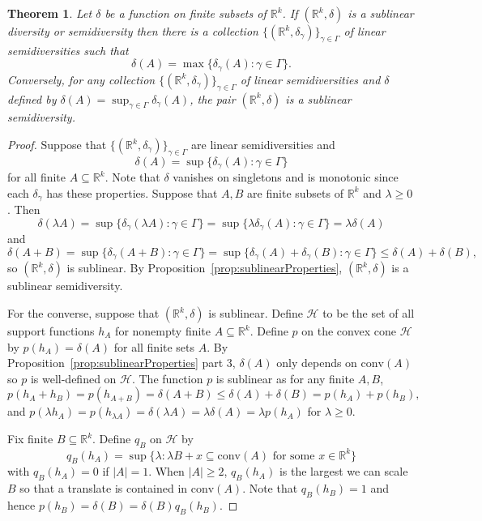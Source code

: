 \documentclass[11pt]{article}
\newtheorem{theorem}{Theorem}
\newcommand{\sH}{\mathcal{H}}
\newcommand{\conv}{\mathrm{conv}}
\renewcommand{\Re}{\mathbb{R}}
\begin{document}
\begin{theorem} \label{thm:sublinearSup}
    Let $\delta$ be a function on finite subsets of $\Re^k$. 
    If $(\Re^k,\delta)$ is a sublinear diversity or semidiversity then there is a collection $\{(\Re^k,\delta_\gamma)\}_{\gamma \in \Gamma}$ of linear semidiversities such that 
    \[\delta(A) = \max\{\delta_\gamma(A):\gamma \in \Gamma\}.\]
Conversely, for any collection $\{(\Re^k,\delta_\gamma)\}_{\gamma \in \Gamma}$ of linear semidiversities and $\delta$ defined by $\delta(A) = \sup_{\gamma \in \Gamma} \delta_\gamma(A)$, the pair $(\Re^k, \delta)$ is a sublinear semidiversity.
\end{theorem}
\begin{proof}
Suppose that $\{(\Re^k,\delta_\gamma)\}_{\gamma \in \Gamma}$ are linear semidiversities and 
 \[\delta(A) = \sup\{\delta_\gamma(A):\gamma \in \Gamma\}\]
    for all finite $A \subseteq \Re^k$. 
Note that $\delta$ vanishes on singletons and is monotonic since each $\delta_\gamma$ has these properties. 
Suppose that $A,B$ are finite subsets of $\Re^k$ and $\lambda \geq 0$. Then 
\[ \delta(\lambda A) = \sup\{\delta_\gamma(\lambda A):\gamma \in \Gamma\} = \sup\{\lambda \delta_\gamma(A):\gamma \in \Gamma\} = \lambda \delta(A)\]
and
\[\delta(A+B) = \sup\{\delta_\gamma(A+B):\gamma \in \Gamma\} = \sup\{\delta_\gamma(A) + \delta_\gamma(B):\gamma \in \Gamma\} \leq \delta(A) + \delta(B),\]
so $(\Re^k,\delta)$ is sublinear.
By Proposition~\ref{prop:sublinearProperties}, $(\Re^k,\delta)$ is a sublinear semidiversity.
 

For the converse, suppose that $(\Re^k,\delta)$ is sublinear. Define $\sH$ to be the set of all support functions $h_A$ for nonempty finite $A \subseteq \Re^k$. Define $p$ on the convex cone $\sH$ by $p(h_A) = \delta(A)$ for all finite sets $A$. By Proposition~\ref{prop:sublinearProperties} part 3, $\delta(A)$ only depends on $\conv(A)$ so $p$ is well-defined on $\sH$. The function $p$ is sublinear as
for any finite $A,B$,
\[
p(h_A + h_B)= p(h_{A+B}) = \delta(A + B) \leq \delta(A) + \delta(B) = p(h_A)+p(h_B),
\]
and $p(\lambda h_A)=p(h_{\lambda A}) = \delta(\lambda A) = \lambda \delta(A) =\lambda p(h_A)$ for $\lambda \geq 0$.

Fix finite $B \subseteq \Re^k$. 
Define $q_B$ on $\sH$ by 
\[q_B(h_A) = \sup\{\lambda: \lambda B +x \subseteq \conv(A) \mbox{ for some $x \in \Re^k$}\}\]
with $q_B(h_A) = 0$ if $|A|=1$. When $|A| \geq 2$,  $q_B(h_A)$ is the largest we can scale $B$ so that a translate is contained in $\conv(A)$.
Note that $q_B(h_B)=1$ and hence $p(h_B)=\delta(B) = \delta(B) q_B(h_B)$.


\end{proof}
\end{document}
